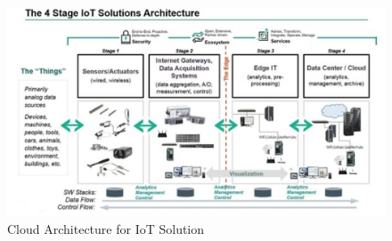 \documentclass[10pt,a4paper,oneside]{scrbook}
\begin{document}
\begin{figure}[h]
    \centering
    \includegraphics[width=1\linewidth]{img/arch_iot.png}
    \caption{Cloud Architecture for IoT Solution}
    \label{fig:Cloud Architecture for IoT Solution}
\end{figure}
\end{document}

